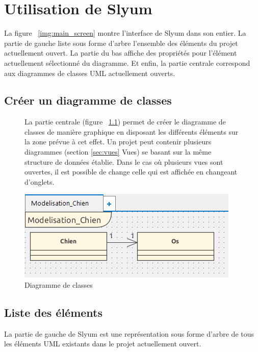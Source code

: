 
\chapter{Utilisation de Slyum}

La figure ~\ref{img:main_screen} montre l'interface de Slyum dans son entier. La partie de gauche liste sous forme d'arbre l'ensemble des éléments du projet actuellement ouvert. La partie du bas affiche des propriétés pour l'élément actuellement sélectionné du diagramme. Et enfin, la partie centrale correspond aux diagrammes de classes UML actuellement ouverts.

\section{Créer un diagramme de classes}

\begin{figure}[h]
	\centering	
	\begin{minipage}[c]{0.54\textwidth}
		La partie centrale (figure ~\ref{img:partie_centrale}) permet de créer le diagramme de classes de manière graphique en disposant les différents éléments sur la zone prévue à cet effet. Un projet peut contenir plusieurs diagrammes (section \ref{sec:vues} Vues) se basant sur la même structure de données établie. Dans le cas où plusieurs vues sont ouvertes, il est possible de change celle qui est affichée en changeant d'onglets.
	\end{minipage}
	\begin{minipage}{0.45\textwidth}
		\flushright
		\includegraphics[width=0.95\linewidth]{images/partie_centrale.png}
		\caption{Diagramme de classes}
		\label{img:partie_centrale}
	\end{minipage}
\end{figure}

\section{Liste des éléments}
La partie de gauche de Slyum est une représentation sous forme d'arbre de tous les éléments UML existants dans le projet actuellement ouvert.

